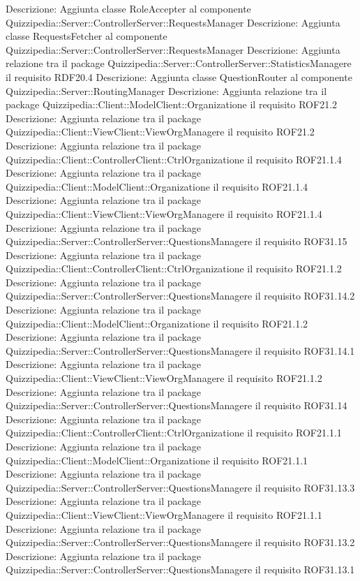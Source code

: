 Descrizione: Aggiunta classe RoleAccepter al componente Quizzipedia::Server::ControllerServer::RequestsManager 
Descrizione: Aggiunta classe RequestsFetcher al componente Quizzipedia::Server::ControllerServer::RequestsManager 
Descrizione: Aggiunta relazione tra il package Quizzipedia::Server::ControllerServer::StatisticsManagere il requisito RDF20.4 
Descrizione: Aggiunta classe QuestionRouter al componente Quizzipedia::Server::RoutingManager 
Descrizione: Aggiunta relazione tra il package Quizzipedia::Client::ModelClient::Organizatione il requisito ROF21.2 
Descrizione: Aggiunta relazione tra il package Quizzipedia::Client::ViewClient::ViewOrgManagere il requisito ROF21.2 
Descrizione: Aggiunta relazione tra il package Quizzipedia::Client::ControllerClient::CtrlOrganizatione il requisito ROF21.1.4 
Descrizione: Aggiunta relazione tra il package Quizzipedia::Client::ModelClient::Organizatione il requisito ROF21.1.4 
Descrizione: Aggiunta relazione tra il package Quizzipedia::Client::ViewClient::ViewOrgManagere il requisito ROF21.1.4 
Descrizione: Aggiunta relazione tra il package Quizzipedia::Server::ControllerServer::QuestionsManagere il requisito ROF31.15 
Descrizione: Aggiunta relazione tra il package Quizzipedia::Client::ControllerClient::CtrlOrganizatione il requisito ROF21.1.2 
Descrizione: Aggiunta relazione tra il package Quizzipedia::Server::ControllerServer::QuestionsManagere il requisito ROF31.14.2 
Descrizione: Aggiunta relazione tra il package Quizzipedia::Client::ModelClient::Organizatione il requisito ROF21.1.2 
Descrizione: Aggiunta relazione tra il package Quizzipedia::Server::ControllerServer::QuestionsManagere il requisito ROF31.14.1 
Descrizione: Aggiunta relazione tra il package Quizzipedia::Client::ViewClient::ViewOrgManagere il requisito ROF21.1.2 
Descrizione: Aggiunta relazione tra il package Quizzipedia::Server::ControllerServer::QuestionsManagere il requisito ROF31.14 
Descrizione: Aggiunta relazione tra il package Quizzipedia::Client::ControllerClient::CtrlOrganizatione il requisito ROF21.1.1 
Descrizione: Aggiunta relazione tra il package Quizzipedia::Client::ModelClient::Organizatione il requisito ROF21.1.1 
Descrizione: Aggiunta relazione tra il package Quizzipedia::Server::ControllerServer::QuestionsManagere il requisito ROF31.13.3 
Descrizione: Aggiunta relazione tra il package Quizzipedia::Client::ViewClient::ViewOrgManagere il requisito ROF21.1.1 
Descrizione: Aggiunta relazione tra il package Quizzipedia::Server::ControllerServer::QuestionsManagere il requisito ROF31.13.2 
Descrizione: Aggiunta relazione tra il package Quizzipedia::Server::ControllerServer::QuestionsManagere il requisito ROF31.13.1 
